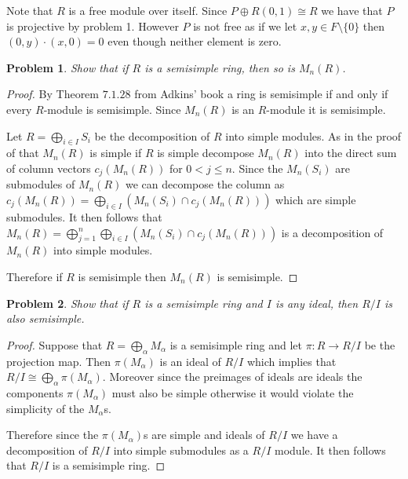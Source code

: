 \documentclass[10pt]{article}
\newcommand{\sk}{\vskip 10mm}
\theoremstyle{plain}
\newtheorem{problem}{Problem}
\theoremstyle{remark}
\begin{document}
Note that $R$ is a free module over itself. Since $P\oplus R(0,1)\cong R$
we have that $P$ is projective by problem 1. However $P$ is
not free as if we let $x,y\in F\setminus\{0\}$ then $(0,y)\cdot(x,0)=0$ even
though neither element is zero.

\sk

\begin{problem}
  Show that if $R$ is a semisimple ring, then so is $M_n(R)$.
\end{problem}

\begin{proof}
  By Theorem $7.1.28$ from Adkins' book a ring is semisimple if and
  only if every $R$-module is semisimple. Since $M_n(R)$ is an $R$-module
  it is semisimple.

  Let $R=\bigoplus_{i\in I}S_i$ be the decomposition of $R$ into simple modules.
  As in the proof of that $M_n(R)$ is simple if $R$ is simple decompose
  $M_n(R)$ into the direct sum of column vectors $c_j(M_n(R))$ for
  $0<j\leq n$. Since the $M_n(S_i)$ are submodules of $M_n(R)$ we can
  decompose the column as $c_j(M_n(R))=\bigoplus_{i\in I}(M_n(S_i)\cap c_j(M_n(R)))$
  which are simple submodules. It then follows that
  $M_n(R)=\bigoplus_{j=1}^n\bigoplus_{i\in I}(M_n(S_i)\cap c_j(M_n(R)))$ is a decomposition of
  $M_n(R)$ into simple modules.

  Therefore if $R$ is semisimple then $M_n(R)$ is semisimple.
\end{proof}

\sk

\begin{problem}
  Show that if $R$ is a semisimple ring and $I$ is any ideal, then $R/I$
  is also semisimple.
\end{problem}

\begin{proof}
  Suppose that $R=\bigoplus_\alpha M_\alpha$ is a semisimple ring and let $\pi:R\rightarrow R/I$ be the
  projection map. Then $\pi(M_\alpha)$ is an ideal of $R/I$ which implies that
  $R/I\cong \bigoplus_\alpha \pi(M_\alpha)$. Moreover since the preimages of ideals are ideals
  the components $\pi(M_\alpha)$ must also be simple otherwise it would violate
  the simplicity of the $M_\alpha$s.

  Therefore since the $\pi(M_\alpha)$s are simple and ideals of $R/I$ we have
  a decomposition of $R/I$ into simple submodules as a $R/I$ module.
  It then follows that $R/I$ is a semisimple ring.
\end{proof}
\end{document}
